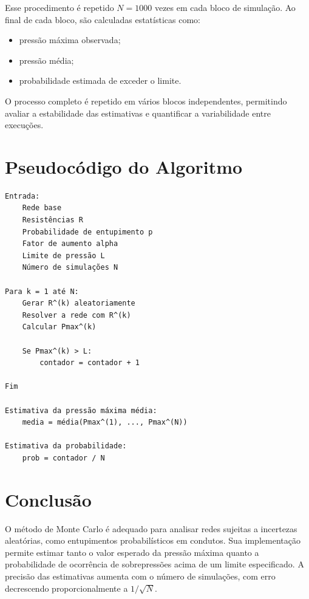 \documentclass{article}
\begin{document}
Esse procedimento é repetido \(N=1000\) vezes em cada bloco de simulação. Ao final de cada bloco, são calculadas estatísticas como:

\begin{itemize}
    \item pressão máxima observada;
    \item pressão média;
    \item probabilidade estimada de exceder o limite.
\end{itemize}

O processo completo é repetido em vários blocos independentes, permitindo avaliar a estabilidade das estimativas e quantificar a variabilidade entre execuções.

\section{Pseudocódigo do Algoritmo}

\begin{verbatim}
Entrada:
    Rede base
    Resistências R
    Probabilidade de entupimento p
    Fator de aumento alpha
    Limite de pressão L
    Número de simulações N

Para k = 1 até N:
    Gerar R^(k) aleatoriamente
    Resolver a rede com R^(k)
    Calcular Pmax^(k)

    Se Pmax^(k) > L:
        contador = contador + 1

Fim

Estimativa da pressão máxima média:
    media = média(Pmax^(1), ..., Pmax^(N))

Estimativa da probabilidade:
    prob = contador / N
\end{verbatim}

\section{Conclusão}

O método de Monte Carlo é adequado para analisar redes sujeitas a incertezas aleatórias, como entupimentos probabilísticos em condutos. Sua implementação permite estimar tanto o valor esperado da pressão máxima quanto a probabilidade de ocorrência de sobrepressões acima de um limite especificado. A precisão das estimativas aumenta com o número de simulações, com erro decrescendo proporcionalmente a \(1/\sqrt{N}\).
\end{document}
